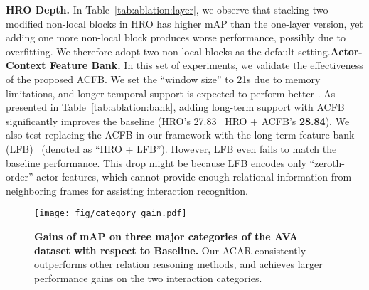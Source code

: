 {\flushleft \bf HRO Depth.} In Table~\ref{tab:ablation:layer}, we observe that stacking two modified non-local blocks in HRO has higher mAP than the one-layer version, yet adding one more non-local block produces worse performance, possibly due to overfitting. We therefore adopt two non-local blocks as the default setting.{\flushleft \bf Actor-Context Feature Bank.} In this set of experiments, we validate the effectiveness of the proposed ACFB. We set the ``window size''  to 21s due to memory limitations, and longer temporal support is expected to perform better \cite{wu2019long}. 
As presented in Table~\ref{tab:ablation:bank}, adding long-term support with ACFB significantly improves the baseline (HRO's 27.83 \ HRO + ACFB's \textbf{28.84}).
We also test replacing the ACFB in our framework with the long-term feature bank (LFB)~\cite{wu2019long} (denoted as ``HRO + LFB''). However, LFB even fails to match the baseline performance. This drop might be because LFB encodes only ``zeroth-order'' actor features, which cannot provide enough relational information from neighboring frames for assisting interaction recognition.




\begin{figure}[t]
\centering
\texttt{[image: fig/category\_gain.pdf]}
\caption{\textbf{Gains of mAP on three major categories of the AVA dataset with respect to Baseline.} Our ACAR consistently outperforms other relation reasoning methods, and achieves larger performance gains on the two interaction categories. \label{fig:catgain}}

\end{figure}
















